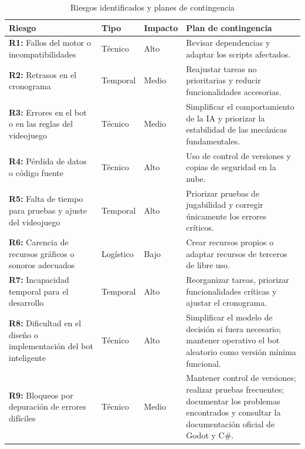 \begin{table}[H]
	\centering
	\begin{tabular}{|
			>{\centering\arraybackslash}p{4cm}|
			>{\centering\arraybackslash}p{2.5cm}|
			>{\centering\arraybackslash}p{2cm}|
			>{\centering\arraybackslash}p{6cm}|}
		\hline
		\textbf{Riesgo} & \textbf{Tipo} & \textbf{Impacto} &
		\textbf{Plan de contingencia} \\
		\hline
		\textbf{R1:} Fallos del motor o incompatibilidades
		& Técnico & Alto
		& Revisar dependencias y adaptar los scripts afectados. \\
		\hline
		\textbf{R2:} Retrasos en el cronograma
		& Temporal & Medio
		& Reajustar tareas no prioritarias y reducir funcionalidades accesorias. \\
		\hline
		\textbf{R3:} Errores en el bot o en las reglas del videojuego
		& Técnico & Medio
		& Simplificar el comportamiento de la IA y priorizar la estabilidad de las mecánicas fundamentales. \\
		\hline
		\textbf{R4:} Pérdida de datos o código fuente
		& Técnico & Alto
		& Uso de control de versiones y copias de seguridad en la nube. \\
		\hline
		\textbf{R5:} Falta de tiempo para pruebas y ajuste del videojuego
		& Temporal & Alto
		& Priorizar pruebas de jugabilidad y corregir únicamente los errores críticos. \\
		\hline
		\textbf{R6:} Carencia de recursos gráficos o sonoros adecuados
		& Logístico & Bajo
		& Crear recursos propios o adaptar recursos de terceros de libre uso. \\
		\hline
		\textbf{R7:} Incapacidad temporal para el desarrollo
		& Temporal & Alto
		& Reorganizar tareas, priorizar funcionalidades críticas y ajustar el cronograma. \\
		\hline
		\textbf{R8:} Dificultad en el diseño o implementación del bot inteligente
		& Técnico & Alto
		& Simplificar el modelo de decisión si fuera necesario; mantener operativo el bot aleatorio como versión mínima funcional. \\
		\hline
		\textbf{R9:} Bloqueos por depuración de errores difíciles
		& Técnico & Medio
		& Mantener control de versiones; realizar pruebas frecuentes; documentar los problemas encontrados y consultar la documentación oficial de Godot y C\#. \\
		\hline
	\end{tabular}
	\caption{Riesgos identificados y planes de contingencia}
	\label{tab:riesgos}
\end{table}

